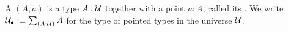 \documentclass[hott-all.tex]{subfiles}
\begin{document}
%
%

\begin{defn} \label{def:pointedtype}
  A 
  $(A,a)$ is a type $A:\mathcal{U}$ together with a point $a:A$, called its .
  We write $\pointed{\type} \defeq \sm{A:\type} A$ for the type of pointed types in the universe $\mathcal{U}$.
\end{defn}
\end{document}
